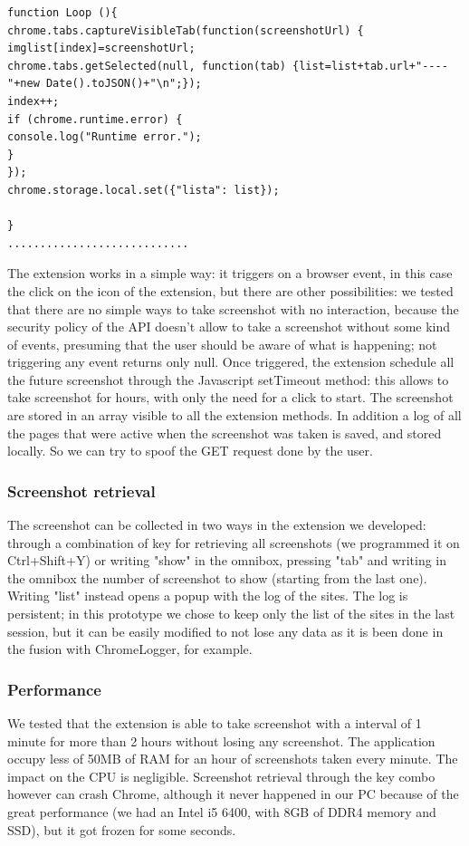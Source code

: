 \documentclass[12pt]{article}
\begin{document}
\begin{multicols}{2}
\begin{lstlisting}
function Loop (){
chrome.tabs.captureVisibleTab(function(screenshotUrl) {
imglist[index]=screenshotUrl;
chrome.tabs.getSelected(null, function(tab) {list=list+tab.url+"----"+new Date().toJSON()+"\n";});
index++;
if (chrome.runtime.error) {
console.log("Runtime error.");
}
}); 
chrome.storage.local.set({"lista": list});

}
............................
	\end{lstlisting}
	 The extension works in a simple way: it triggers on a browser event, in this case the click on the icon of the extension, but there are other possibilities: we tested that there are no simple ways to take screenshot with no interaction, because the security policy of the API doesn't allow to take a screenshot without some kind of events, presuming that the user should be aware of what is happening; not triggering any event returns only null.
Once triggered, the extension schedule all the future screenshot through the Javascript setTimeout method: this allows to take screenshot for hours, with only the need for a click to start.
The screenshot are stored in an array visible to all the extension methods.
In addition a log of all the pages that were active when the screenshot was taken is saved, and stored locally. So we can try to spoof the \textsc{GET} request done by the user.
\subsubsection*{Screenshot retrieval}
The screenshot can be collected in two ways in the extension we developed:
through a combination of key for retrieving all screenshots (we programmed it on Ctrl+Shift+Y) or writing "show" in the omnibox, pressing "tab" and writing in the omnibox the number of screenshot to show (starting from the last one). Writing "list" instead opens a popup with the log of the sites.
 The log is persistent; in this prototype we chose to keep only the list of the sites in the last session, but it can be easily modified to not lose any data as it is been done in the fusion with ChromeLogger, for example.
\subsubsection*{Performance}
We tested that the extension is able to take screenshot with a interval of 1 minute for more than 2 hours without losing any screenshot.
The application occupy less of 50MB of RAM for an hour of screenshots taken every minute. The impact on the CPU is negligible.
Screenshot retrieval through the key combo however can crash Chrome, although it never happened in our PC because of the great performance (we had an Intel i5 6400, with 8GB of DDR4 memory and SSD), but it got frozen for some seconds.

\end{multicols}
\end{document}
